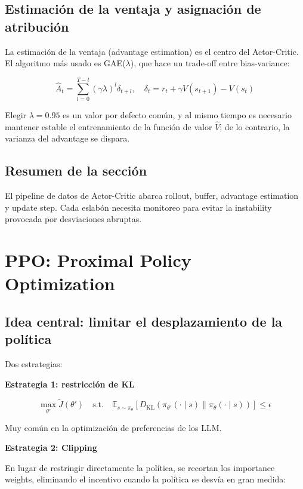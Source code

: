 \documentclass[a4paper]{article}
\begin{document}
\subsection{Estimación de la ventaja y asignación de atribución}

La estimación de la ventaja (advantage estimation) es el centro del Actor-Critic. El algoritmo más usado es GAE($\lambda$), que hace un trade-off entre bias-variance:

$$\hat{A}_t = \sum_{l=0}^{T-t}(\gamma \lambda)^l \delta_{t+l},\quad \delta_t = r_t + \gamma V(s_{t+1}) - V(s_t)$$

Elegir $\lambda=0.95$ es un valor por defecto común, y al mismo tiempo es necesario mantener estable el entrenamiento de la función de valor $\hat{V}$; de lo contrario, la varianza del advantage se dispara.

\subsection{Resumen de la sección}

El pipeline de datos de Actor-Critic abarca rollout, buffer, advantage estimation y update step. Cada eslabón necesita monitoreo para evitar la instability provocada por desviaciones abruptas.

\section{PPO: Proximal Policy Optimization}

\subsection{Idea central: limitar el desplazamiento de la política}

Dos estrategias:

\textbf{Estrategia 1: restricción de KL}

$$\max_{\theta'} \tilde{J}(\theta') \quad \text{s.t.} \quad \mathbb{E}_{s \sim \pi_\theta}\left[D_{\mathrm{KL}}\left(\pi_{\theta'}(\cdot \mid s) \| \pi_\theta(\cdot \mid s)\right)\right] \leq \epsilon$$

Muy común en la optimización de preferencias de los LLM.

\textbf{Estrategia 2: Clipping}

En lugar de restringir directamente la política, se recortan los importance weights, eliminando el incentivo cuando la política se desvía en gran medida:
\end{document}
